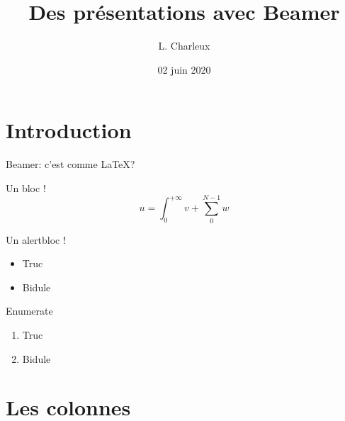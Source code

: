 \documentclass[11pt]{beamer} %
\author{L. Charleux}
\title{ Des présentations avec Beamer}
\institute{USMB}
\date{02 juin 2020}
\begin{document}
\begin{frame}
\titlepage
\end{frame}

\begin{frame}
\tableofcontents
\end{frame}

\section{Introduction}
\begin{frame}{Beamer: c'est comme \LaTeX ?}
\begin{block}{Un bloc !}
$$
u = \int_0^{+\infty}v + \sum_0^{N-1} w
$$
\end{block}

\begin{alertblock}{Un alertbloc !}
\begin{itemize}
\item Truc
\item Bidule
\end{itemize}
\end{alertblock}

\begin{alertblock}{Enumerate}
\begin{enumerate}
\item Truc
\item Bidule
\end{enumerate}

\end{alertblock}

\end{frame}

\section{Les colonnes}
\end{document}
